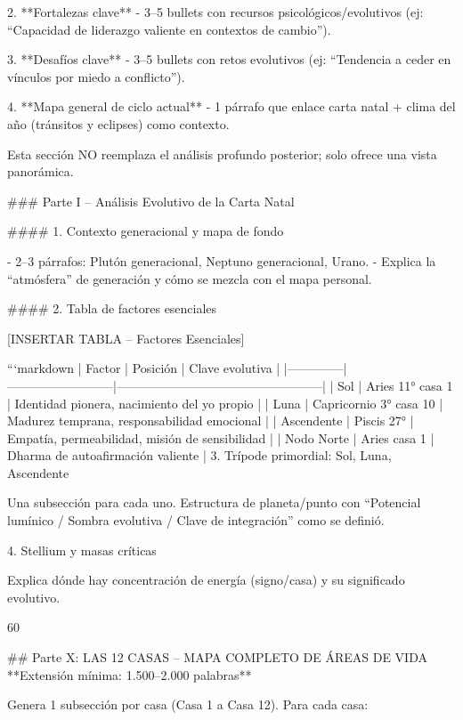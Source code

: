 2. **Fortalezas clave**  
   - 3–5 bullets con recursos psicológicos/evolutivos (ej: “Capacidad de liderazgo valiente en contextos de cambio”).

3. **Desafíos clave**  
   - 3–5 bullets con retos evolutivos (ej: “Tendencia a ceder en vínculos por miedo a conflicto”).

4. **Mapa general de ciclo actual**  
   - 1 párrafo que enlace carta natal + clima del año (tránsitos y eclipses) como contexto.

Esta sección NO reemplaza el análisis profundo posterior; solo ofrece una vista panorámica.


### Parte I – Análisis Evolutivo de la Carta Natal

#### 1. Contexto generacional y mapa de fondo

- 2–3 párrafos: Plutón generacional, Neptuno generacional, Urano.  
- Explica la “atmósfera” de generación y cómo se mezcla con el mapa personal.

#### 2. Tabla de factores esenciales

[INSERTAR TABLA – Factores Esenciales]

```markdown
| Factor        | Posición                 | Clave evolutiva                                  |
|--------------|--------------------------|--------------------------------------------------|
| Sol          | Aries 11° casa 1        | Identidad pionera, nacimiento del yo propio     |
| Luna         | Capricornio 3° casa 10  | Madurez temprana, responsabilidad emocional     |
| Ascendente   | Piscis 27°              | Empatía, permeabilidad, misión de sensibilidad  |
| Nodo Norte   | Aries casa 1            | Dharma de autoafirmación valiente               |
3. Trípode primordial: Sol, Luna, Ascendente

Una subsección para cada uno.
Estructura de planeta/punto con “Potencial lumínico / Sombra evolutiva / Clave de integración” como se definió.

4. Stellium y masas críticas

Explica dónde hay concentración de energía (signo/casa) y su significado evolutivo.

60%

## Parte X: LAS 12 CASAS – MAPA COMPLETO DE ÁREAS DE VIDA  
**Extensión mínima: 1.500–2.000 palabras**

Genera 1 subsección por casa (Casa 1 a Casa 12).  
Para cada casa:

